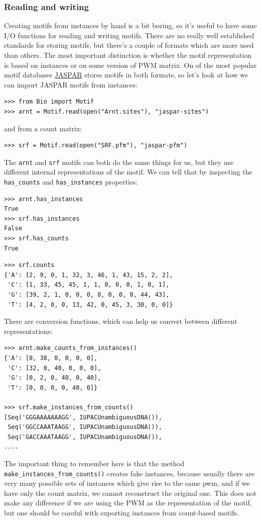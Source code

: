 \documentclass{report}
\begin{document}
\subsubsection{Reading and writing}

Creating motifs from instances by hand is a bit boring, so it's
useful to have some I/O functions for reading and writing
motifs. There are no really well established standards for storing
motifs, but there's a couple of formats which are more used than
others. The most important distinction is whether the motif
representation is based on instances or on some version of PWM matrix.
On of the most popular motif databases \href{http://jaspar.genereg.net}{JASPAR}
 stores motifs in both formats, so
let's look at how we can import JASPAR motifs from instances:
\begin{verbatim}
>>> from Bio import Motif
>>> arnt = Motif.read(open("Arnt.sites"), "jaspar-sites")
\end{verbatim}
and from a count matrix:
\begin{verbatim}
>>> srf = Motif.read(open("SRF.pfm"), "jaspar-pfm")
\end{verbatim}

The \verb|arnt| and \verb|srf| motifs can both do the same things for
us, but they use different internal representations of the motif. We
can tell that by inspecting the \verb|has_counts| and
\verb|has_instances| properties:
\begin{verbatim}
>>> arnt.has_instances
True
>>> srf.has_instances
False
>>> srf.has_counts
True
\end{verbatim}
\begin{verbatim}
>>> srf.counts
{'A': [2, 9, 0, 1, 32, 3, 46, 1, 43, 15, 2, 2],
 'C': [1, 33, 45, 45, 1, 1, 0, 0, 0, 1, 0, 1],
 'G': [39, 2, 1, 0, 0, 0, 0, 0, 0, 0, 44, 43],
 'T': [4, 2, 0, 0, 13, 42, 0, 45, 3, 30, 0, 0]}
\end{verbatim}

There are conversion functions, which can help us convert between
different representations:
\begin{verbatim}
>>> arnt.make_counts_from_instances()
{'A': [8, 38, 0, 0, 0, 0],
 'C': [32, 0, 40, 0, 0, 0],
 'G': [0, 2, 0, 40, 0, 40],
 'T': [0, 0, 0, 0, 40, 0]}

>>> srf.make_instances_from_counts()
[Seq('GGGAAAAAAAGG', IUPACUnambiguousDNA()),
 Seq('GGCCAAATAAGG', IUPACUnambiguousDNA()),
 Seq('GACCAAATAAGG', IUPACUnambiguousDNA()),
....
\end{verbatim}
The important thing to remember here is that the method
\verb|make_instances_from_counts()| creates fake instances, because
usually there are very many possible sets of instances which give rise
to the same pwm, and if we have only the count matrix, we cannot
reconstruct the original one. This does not make any difference if we
are using the PWM as the representation of the motif, but one should
be careful with exporting instances from count-based motifs.
\end{document}
